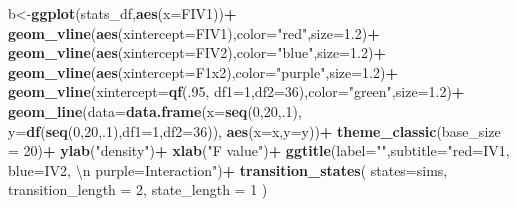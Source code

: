 \documentclass[]{book}
\newenvironment{Shaded}{\begin{snugshade}}{\end{snugshade}}
\newcommand{\CharTok}[1]{\textcolor[rgb]{0.31,0.60,0.02}{#1}}
\newcommand{\DataTypeTok}[1]{\textcolor[rgb]{0.13,0.29,0.53}{#1}}
\newcommand{\DecValTok}[1]{\textcolor[rgb]{0.00,0.00,0.81}{#1}}
\newcommand{\FloatTok}[1]{\textcolor[rgb]{0.00,0.00,0.81}{#1}}
\newcommand{\KeywordTok}[1]{\textcolor[rgb]{0.13,0.29,0.53}{\textbf{#1}}}
\newcommand{\NormalTok}[1]{#1}
\newcommand{\OperatorTok}[1]{\textcolor[rgb]{0.81,0.36,0.00}{\textbf{#1}}}
\newcommand{\StringTok}[1]{\textcolor[rgb]{0.31,0.60,0.02}{#1}}
\begin{document}
\begin{Shaded}
\begin{Highlighting}[]
{{{{\NormalTok{b<-}\KeywordTok{ggplot}\NormalTok{(stats_df,}\KeywordTok{aes}\NormalTok{(}\DataTypeTok{x=}\NormalTok{FIV1))}\OperatorTok{+}
\StringTok{  }\KeywordTok{geom_vline}\NormalTok{(}\KeywordTok{aes}\NormalTok{(}\DataTypeTok{xintercept=}\NormalTok{FIV1),}\DataTypeTok{color=}\StringTok{"red"}\NormalTok{,}\DataTypeTok{size=}\FloatTok{1.2}\NormalTok{)}\OperatorTok{+}
\StringTok{  }\KeywordTok{geom_vline}\NormalTok{(}\KeywordTok{aes}\NormalTok{(}\DataTypeTok{xintercept=}\NormalTok{FIV2),}\DataTypeTok{color=}\StringTok{"blue"}\NormalTok{,}\DataTypeTok{size=}\FloatTok{1.2}\NormalTok{)}\OperatorTok{+}
\StringTok{  }\KeywordTok{geom_vline}\NormalTok{(}\KeywordTok{aes}\NormalTok{(}\DataTypeTok{xintercept=}\NormalTok{F1x2),}\DataTypeTok{color=}\StringTok{"purple"}\NormalTok{,}\DataTypeTok{size=}\FloatTok{1.2}\NormalTok{)}\OperatorTok{+}
\StringTok{  }\KeywordTok{geom_vline}\NormalTok{(}\DataTypeTok{xintercept=}\KeywordTok{qf}\NormalTok{(.}\DecValTok{95}\NormalTok{, }\DataTypeTok{df1=}\DecValTok{1}\NormalTok{,}\DataTypeTok{df2=}\DecValTok{36}\NormalTok{),}\DataTypeTok{color=}\StringTok{"green"}\NormalTok{,}\DataTypeTok{size=}\FloatTok{1.2}\NormalTok{)}\OperatorTok{+}
\StringTok{  }\KeywordTok{geom_line}\NormalTok{(}\DataTypeTok{data=}\KeywordTok{data.frame}\NormalTok{(}\DataTypeTok{x=}\KeywordTok{seq}\NormalTok{(}\DecValTok{0}\NormalTok{,}\DecValTok{20}\NormalTok{,.}\DecValTok{1}\NormalTok{),}
                            \DataTypeTok{y=}\KeywordTok{df}\NormalTok{(}\KeywordTok{seq}\NormalTok{(}\DecValTok{0}\NormalTok{,}\DecValTok{20}\NormalTok{,.}\DecValTok{1}\NormalTok{),}\DataTypeTok{df1=}\DecValTok{1}\NormalTok{,}\DataTypeTok{df2=}\DecValTok{36}\NormalTok{)),}
            \KeywordTok{aes}\NormalTok{(}\DataTypeTok{x=}\NormalTok{x,}\DataTypeTok{y=}\NormalTok{y))}\OperatorTok{+}
\StringTok{  }\KeywordTok{theme_classic}\NormalTok{(}\DataTypeTok{base_size =} \DecValTok{20}\NormalTok{)}\OperatorTok{+}
\StringTok{  }\KeywordTok{ylab}\NormalTok{(}\StringTok{"density"}\NormalTok{)}\OperatorTok{+}
\StringTok{  }\KeywordTok{xlab}\NormalTok{(}\StringTok{"F value"}\NormalTok{)}\OperatorTok{+}
\StringTok{  }\KeywordTok{ggtitle}\NormalTok{(}\DataTypeTok{label=}\StringTok{""}\NormalTok{,}\DataTypeTok{subtitle=}\StringTok{"red=IV1, blue=IV2, }\CharTok{\textbackslash{}n}\StringTok{ purple=Interaction"}\NormalTok{)}\OperatorTok{+}
\StringTok{  }\KeywordTok{transition_states}\NormalTok{(}
    \DataTypeTok{states=}\NormalTok{sims,}
    \DataTypeTok{transition_length =} \DecValTok{2}\NormalTok{,}
    \DataTypeTok{state_length =} \DecValTok{1}
\NormalTok{  )}

}}}}
\end{Highlighting}
\end{Shaded}
\end{document}

